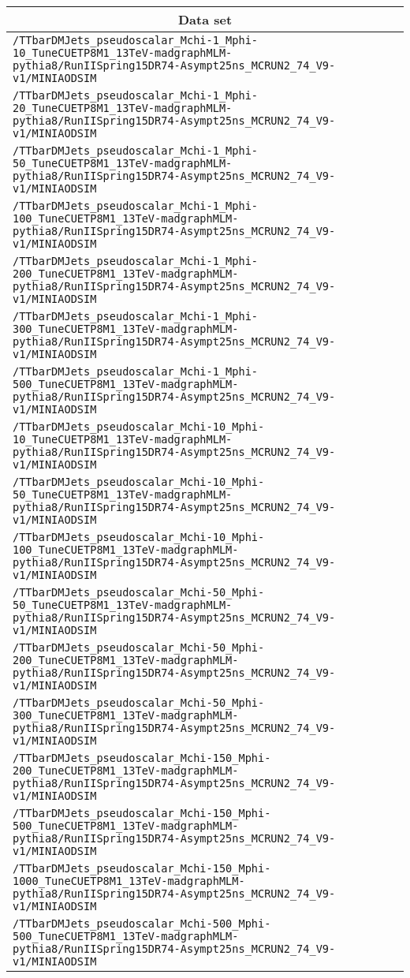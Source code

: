 \begin{center}
\begin{tabular}{l}
\hline\hline
\multicolumn{1}{c}{Data set}\tabularnewline
\hline
\verb!/TTbarDMJets_pseudoscalar_Mchi-1_Mphi-10_TuneCUETP8M1_13TeV-madgraphMLM-pythia8/RunIISpring15DR74-Asympt25ns_MCRUN2_74_V9-v1/MINIAODSIM! \tabularnewline
\verb!/TTbarDMJets_pseudoscalar_Mchi-1_Mphi-20_TuneCUETP8M1_13TeV-madgraphMLM-pythia8/RunIISpring15DR74-Asympt25ns_MCRUN2_74_V9-v1/MINIAODSIM! \tabularnewline
\verb!/TTbarDMJets_pseudoscalar_Mchi-1_Mphi-50_TuneCUETP8M1_13TeV-madgraphMLM-pythia8/RunIISpring15DR74-Asympt25ns_MCRUN2_74_V9-v1/MINIAODSIM! \tabularnewline
\verb!/TTbarDMJets_pseudoscalar_Mchi-1_Mphi-100_TuneCUETP8M1_13TeV-madgraphMLM-pythia8/RunIISpring15DR74-Asympt25ns_MCRUN2_74_V9-v1/MINIAODSIM! \tabularnewline
\verb!/TTbarDMJets_pseudoscalar_Mchi-1_Mphi-200_TuneCUETP8M1_13TeV-madgraphMLM-pythia8/RunIISpring15DR74-Asympt25ns_MCRUN2_74_V9-v1/MINIAODSIM! \tabularnewline
\verb!/TTbarDMJets_pseudoscalar_Mchi-1_Mphi-300_TuneCUETP8M1_13TeV-madgraphMLM-pythia8/RunIISpring15DR74-Asympt25ns_MCRUN2_74_V9-v1/MINIAODSIM! \tabularnewline
\verb!/TTbarDMJets_pseudoscalar_Mchi-1_Mphi-500_TuneCUETP8M1_13TeV-madgraphMLM-pythia8/RunIISpring15DR74-Asympt25ns_MCRUN2_74_V9-v1/MINIAODSIM! \tabularnewline
\verb!/TTbarDMJets_pseudoscalar_Mchi-10_Mphi-10_TuneCUETP8M1_13TeV-madgraphMLM-pythia8/RunIISpring15DR74-Asympt25ns_MCRUN2_74_V9-v1/MINIAODSIM! \tabularnewline
\verb!/TTbarDMJets_pseudoscalar_Mchi-10_Mphi-50_TuneCUETP8M1_13TeV-madgraphMLM-pythia8/RunIISpring15DR74-Asympt25ns_MCRUN2_74_V9-v1/MINIAODSIM! \tabularnewline
\verb!/TTbarDMJets_pseudoscalar_Mchi-10_Mphi-100_TuneCUETP8M1_13TeV-madgraphMLM-pythia8/RunIISpring15DR74-Asympt25ns_MCRUN2_74_V9-v1/MINIAODSIM! \tabularnewline
\verb!/TTbarDMJets_pseudoscalar_Mchi-50_Mphi-50_TuneCUETP8M1_13TeV-madgraphMLM-pythia8/RunIISpring15DR74-Asympt25ns_MCRUN2_74_V9-v1/MINIAODSIM! \tabularnewline
\verb!/TTbarDMJets_pseudoscalar_Mchi-50_Mphi-200_TuneCUETP8M1_13TeV-madgraphMLM-pythia8/RunIISpring15DR74-Asympt25ns_MCRUN2_74_V9-v1/MINIAODSIM! \tabularnewline
\verb!/TTbarDMJets_pseudoscalar_Mchi-50_Mphi-300_TuneCUETP8M1_13TeV-madgraphMLM-pythia8/RunIISpring15DR74-Asympt25ns_MCRUN2_74_V9-v1/MINIAODSIM! \tabularnewline
\verb!/TTbarDMJets_pseudoscalar_Mchi-150_Mphi-200_TuneCUETP8M1_13TeV-madgraphMLM-pythia8/RunIISpring15DR74-Asympt25ns_MCRUN2_74_V9-v1/MINIAODSIM! \tabularnewline
\verb!/TTbarDMJets_pseudoscalar_Mchi-150_Mphi-500_TuneCUETP8M1_13TeV-madgraphMLM-pythia8/RunIISpring15DR74-Asympt25ns_MCRUN2_74_V9-v1/MINIAODSIM! \tabularnewline
\verb!/TTbarDMJets_pseudoscalar_Mchi-150_Mphi-1000_TuneCUETP8M1_13TeV-madgraphMLM-pythia8/RunIISpring15DR74-Asympt25ns_MCRUN2_74_V9-v1/MINIAODSIM! \tabularnewline
\verb!/TTbarDMJets_pseudoscalar_Mchi-500_Mphi-500_TuneCUETP8M1_13TeV-madgraphMLM-pythia8/RunIISpring15DR74-Asympt25ns_MCRUN2_74_V9-v1/MINIAODSIM! \tabularnewline
\hline
\end{tabular}\end{center}
